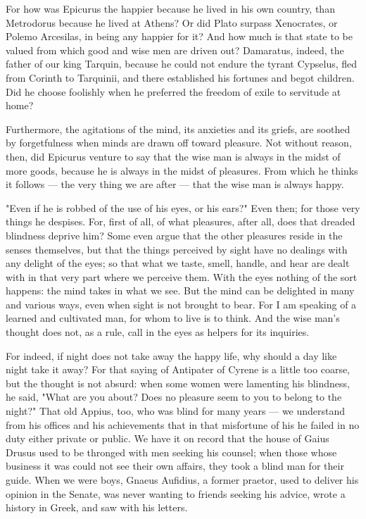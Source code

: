  For how was Epicurus the happier because he lived in his own country, than Metrodorus because he lived at Athens? Or did Plato surpass Xenocrates, or Polemo Arcesilas, in being any happier for it? And how much is that state to be valued from which good and wise men are driven out? Damaratus, indeed, the father of our king Tarquin, because he could not endure the tyrant Cypselus, fled from Corinth to Tarquinii, and there established his fortunes and begot children. Did he choose foolishly when he preferred the freedom of exile to servitude at home?

 Furthermore, the agitations of the mind, its anxieties and its griefs, are soothed by forgetfulness when minds are drawn off toward pleasure. Not without reason, then, did Epicurus venture to say that the wise man is always in the midst of more goods, because he is always in the midst of pleasures. From which he thinks it follows — the very thing we are after — that the wise man is always happy.

 "Even if he is robbed of the use of his eyes, or his ears?" Even then; for those very things he despises. For, first of all, of what pleasures, after all, does that dreaded blindness deprive him? Some even argue that the other pleasures reside in the senses themselves, but that the things perceived by sight have no dealings with any delight of the eyes; so that what we taste, smell, handle, and hear are dealt with in that very part where we perceive them. With the eyes nothing of the sort happens: the mind takes in what we see. But the mind can be delighted in many and various ways, even when sight is not brought to bear. For I am speaking of a learned and cultivated man, for whom to live is to think. And the wise man's thought does not, as a rule, call in the eyes as helpers for its inquiries.

 For indeed, if night does not take away the happy life, why should a day like night take it away? For that saying of Antipater of Cyrene is a little too coarse, but the thought is not absurd: when some women were lamenting his blindness, he said, "What are you about? Does no pleasure seem to you to belong to the night?" That old Appius, too, who was blind for many years — we understand from his offices and his achievements that in that misfortune of his he failed in no duty either private or public. We have it on record that the house of Gaius Drusus used to be thronged with men seeking his counsel; when those whose business it was could not see their own affairs, they took a blind man for their guide. When we were boys, Gnaeus Aufidius, a former praetor, used to deliver his opinion in the Senate, was never wanting to friends seeking his advice, wrote a history in Greek, and saw with his letters.


